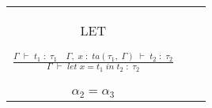 {\begin{tabular}{|c|c|c|}
	& \\[5ex]
	\hline
	LET\begin{LARGE}$\frac{\Gamma\; \vdash\; t_1\;:\;\tau_1 \quad \Gamma,\; x\;:\; ta(\tau_1,\;\Gamma)\;\vdash\; t_2\; :\; \tau_2}{\Gamma\; \vdash\; let\; x = t_1\; in\; t_2\; :\; \tau_2}$\end{LARGE}
	& \multlineTable{LET\begin{LARGE}$\frac{\Gamma\; \vdash\; t_1\;:\;\alpha_2 \quad \Gamma,\; x\;:\; ta(\alpha_2,\;\Gamma)\;\vdash\; t_2\; :\; \alpha_3}{\Gamma\; \vdash\; let\; x = t_1\; in\; t_2\; :\; \alpha_1}:$\end{LARGE} \\ $\alpha_2 = \alpha_3$}  
	& \\[5ex]
	\hline
\end{tabular} 
}